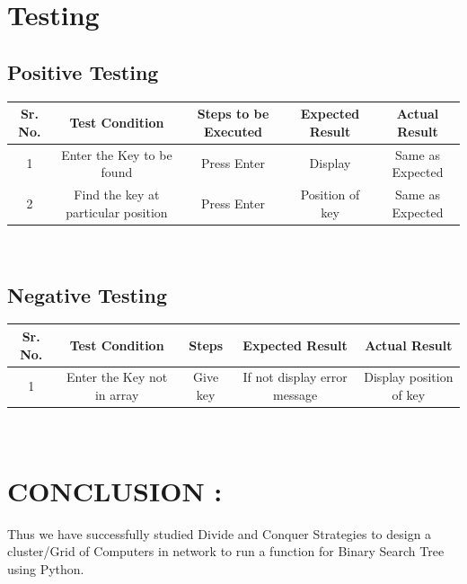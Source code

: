 \documentclass[10pt,a4paper]{article}
\begin{document}
\section{Testing}

\vspace{20px}

\subsection{Positive Testing}
\begin{center}
	\begin{tabular}
		{|c|c|c|c|c|}\hline
		{\bf Sr. No.}		&{\bf Test Condition }	&{\bf Steps to be Executed}	&{\bf Expected Result} & Actual Result \\ \hline
		{1}	&	{Enter the Key to be found}& {Press Enter}		&  {Display} & {Same as Expected}\\ 
		\hline
		{2}	&	{Find the key at particular position}& {Press Enter}		&  {Position of key} & {Same as Expected}\\ 
		\hline
		
	\end{tabular}\\ 
\end{center}

\subsection{Negative Testing}
\begin{center}
	\begin{tabular}
		{|c|c|c|c|c|}\hline
		{\bf Sr. No.}		&{\bf Test Condition }	&{\bf Steps}	&{\bf Expected Result} & Actual Result \\ \hline
		{1}	&	{Enter the Key not in array}& {Give key}&  {If not display error message} & {Display position of key}\\
		\hline
		
	\end{tabular}\\ 
\end{center}

\section{CONCLUSION :}
Thus we have successfully studied Divide and Conquer Strategies to design a cluster/Grid of Computers in network to run a function for Binary Search Tree using Python.\\\\
\end{document}
